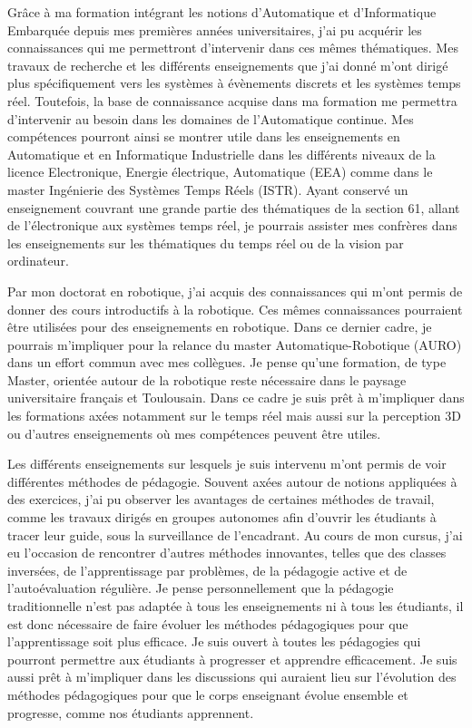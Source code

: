 Grâce à ma formation intégrant les notions d'Automatique et d'Informatique Embarquée depuis mes premières années universitaires, j'ai pu acquérir les connaissances qui me permettront d'intervenir dans ces mêmes thématiques. Mes travaux de recherche et les différents enseignements que j'ai donné m'ont dirigé plus spécifiquement vers les systèmes à évènements discrets et les systèmes temps réel. Toutefois, la base de connaissance acquise dans ma formation me permettra d'intervenir au besoin dans les domaines de l'Automatique continue.
Mes compétences pourront ainsi se montrer utile dans les enseignements en Automatique et en Informatique Industrielle dans les différents niveaux de la licence Electronique, Energie électrique, Automatique (EEA) comme dans le master Ingénierie des Systèmes Temps Réels (ISTR).
Ayant conservé un enseignement couvrant une grande partie des thématiques de la section 61, allant de l'électronique aux systèmes temps réel, je pourrais assister mes confrères dans les enseignements sur les thématiques du temps réel ou de la vision par ordinateur.

Par mon doctorat en robotique, j'ai acquis des connaissances qui m'ont permis de donner des cours introductifs à la robotique. Ces mêmes connaissances pourraient être utilisées pour des enseignements en robotique. Dans ce dernier cadre, je pourrais m'impliquer pour la relance du master Automatique-Robotique (AURO) dans un effort commun avec mes collègues. Je pense qu'une formation, de type Master, orientée autour de la robotique reste nécessaire dans le paysage universitaire français et Toulousain. Dans ce cadre je suis prêt à m'impliquer dans les formations axées notamment sur le temps réel mais aussi sur la perception 3D ou d'autres enseignements où mes compétences peuvent être utiles.

Les différents enseignements sur lesquels je suis intervenu m'ont permis de voir différentes méthodes de pédagogie. Souvent axées autour de notions appliquées à des exercices, j'ai pu observer les avantages de certaines méthodes de travail, comme les travaux dirigés en groupes autonomes afin d'ouvrir les étudiants à tracer leur guide, sous la surveillance de l'encadrant. Au cours de mon cursus, j'ai eu l'occasion de rencontrer d'autres méthodes innovantes, telles que des classes inversées, de l'apprentissage par problèmes, de la pédagogie active et de l'autoévaluation régulière. Je pense personnellement que la pédagogie traditionnelle n'est pas adaptée à tous les enseignements ni à tous les étudiants, il est donc nécessaire de faire évoluer les méthodes pédagogiques pour que l'apprentissage soit plus efficace. Je suis ouvert à toutes les pédagogies qui pourront permettre aux étudiants à progresser et apprendre efficacement. Je suis aussi prêt à m'impliquer dans les discussions qui auraient lieu sur l'évolution des méthodes pédagogiques pour que le corps enseignant évolue ensemble et progresse, comme nos étudiants apprennent.


